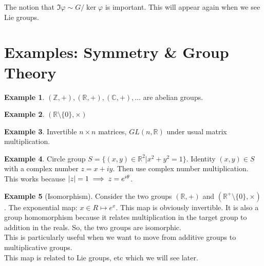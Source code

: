 \documentclass{book}
\theoremstyle{definition}
\newtheorem{exmp}{Example}[section]
\begin{document}
The notion that $\Im \varphi \sim G/\ker\varphi$ is important. This will appear again when we see Lie groups. 






\section{Examples: Symmetry \& Group Theory }

\begin{exmp}
	$(\mathbb{Z},+), (\mathbb{R},+), (\mathbb{C},+), \dots$ are abelian groups. 
\end{exmp}

\begin{exmp}
	$(\mathbb{R} \setminus \{0\}, \times)$ 
\end{exmp}

\begin{exmp}
	Invertible $n\times n$ matrices, $GL(n,\mathbb{R})$ under usual matrix multiplication. 
\end{exmp}

\begin{exmp}
	Circle group $S = \{(x,y) \in \mathbb{R}^2  \vert x^2 + y^2 = 1    \}$. Identity $(x,y) \in S$ with a complex number $z = x+iy$. Then use complex number multiplication. This works because $\abs{z} = 1 \implies z= e^{i\theta}$.
\end{exmp}




\begin{exmp}[Isomorphism]
	Consider the two groups $(\mathbb{R},+)$ and $(\mathbb{R}^+\setminus\{0\}, \times)$. The exponential map: $x\in R \mapsto e^x$. This map is obviously invertible. It is also a group homomorphism because it relates multiplication in the target group to addition in the reals. So, the two groups are isomorphic. \\
	
	This is particularly useful when we want to move from additive groups to multiplicative groups. \\
	
	This map is related to Lie groups, etc which we will see later.  
\end{exmp}









\newpage
\end{document}
